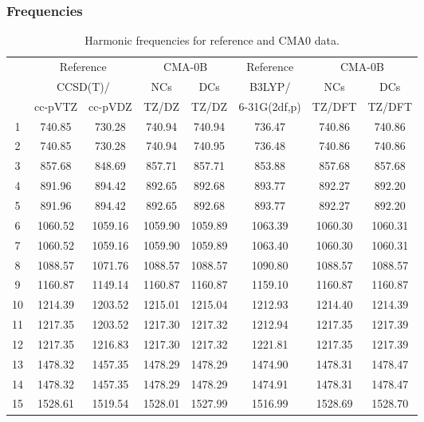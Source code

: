 \documentclass[10pt,oneside]{article}
\begin{document}
\subsubsection*{Frequencies}
\begin{table}[h!]
\centering
\caption{Harmonic frequencies for reference and CMA0 data.}
\begin{tabular}{cccccccc}
\toprule
{} & \multicolumn{2}{c}{Reference} & \multicolumn{2}{c}{CMA-0B} &    Reference & \multicolumn{2}{c}{CMA-0B} \\
{} & \multicolumn{2}{c}{CCSD(T)/} &     NCs &     DCs &       B3LYP/ &     NCs &     DCs \\
{} &   cc-pVTZ & cc-pVDZ &   TZ/DZ &   TZ/DZ & 6-31G(2df,p) &  TZ/DFT &  TZ/DFT \\
\midrule
1  &    740.85 &  730.28 &  740.94 &  740.94 &       736.47 &  740.86 &  740.86 \\
2  &    740.85 &  730.28 &  740.94 &  740.95 &       736.48 &  740.86 &  740.86 \\
3  &    857.68 &  848.69 &  857.71 &  857.71 &       853.88 &  857.68 &  857.68 \\
4  &    891.96 &  894.42 &  892.65 &  892.68 &       893.77 &  892.27 &  892.20 \\
5  &    891.96 &  894.42 &  892.65 &  892.68 &       893.77 &  892.27 &  892.20 \\
6  &   1060.52 & 1059.16 & 1059.90 & 1059.89 &      1063.39 & 1060.30 & 1060.31 \\
7  &   1060.52 & 1059.16 & 1059.90 & 1059.89 &      1063.40 & 1060.30 & 1060.31 \\
8  &   1088.57 & 1071.76 & 1088.57 & 1088.57 &      1090.80 & 1088.57 & 1088.57 \\
9  &   1160.87 & 1149.14 & 1160.87 & 1160.87 &      1159.10 & 1160.87 & 1160.87 \\
10 &   1214.39 & 1203.52 & 1215.01 & 1215.04 &      1212.93 & 1214.40 & 1214.39 \\
11 &   1217.35 & 1203.52 & 1217.30 & 1217.32 &      1212.94 & 1217.35 & 1217.39 \\
12 &   1217.35 & 1216.83 & 1217.30 & 1217.32 &      1221.81 & 1217.35 & 1217.39 \\
13 &   1478.32 & 1457.35 & 1478.29 & 1478.29 &      1474.90 & 1478.31 & 1478.47 \\
14 &   1478.32 & 1457.35 & 1478.29 & 1478.29 &      1474.91 & 1478.31 & 1478.47 \\
15 &   1528.61 & 1519.54 & 1528.01 & 1527.99 &      1516.99 & 1528.69 & 1528.70 \\

\end{tabular}
\end{table}
\end{document}
